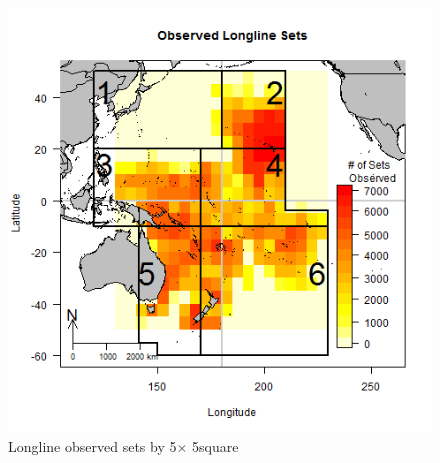 \documentclass[12pt]{SCreport}
\begin{document}
\begin{figure}
\begin{center}
\includegraphics[scale=0.95]{../GRAPHICS/Defined/FIG_03_obs_ll_sets}
\caption{\label{fig:fig03} Longline observed sets by 5\degree $\times$ 5\degree square}
\end{center}
\end{figure}
\end{document}
